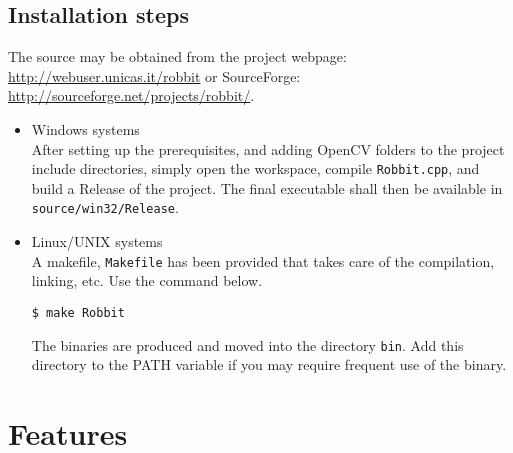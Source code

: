 \documentclass[10pt,a4paper]{article}
\begin{document}
\subsection{Installation steps}
The source may be obtained from the project webpage: \href{http://webuser.unicas.it/robbit}{http://webuser.unicas.it/robbit} or SourceForge: \href{http://sourceforge.net/projects/robbit/}{http://sourceforge.net/projects/robbit/}.

\begin{itemize}
\item Windows systems \\
After setting up the prerequisites, and adding OpenCV folders to the project include directories, simply open the workspace, compile {\tt Robbit.cpp}, and build a Release of the project. The final executable shall then be available in {\tt source/win32/Release}.
\item Linux/UNIX systems \\
A makefile, {\tt Makefile} has been provided that takes care of the compilation, linking, etc. Use the command below.

\begin{verbatim}
$ make Robbit
\end{verbatim}
The binaries are produced and moved into the directory {\tt bin}. Add this directory to the PATH variable if you may require frequent use of the binary.
\end{itemize}

\newpage

\section{Features}
\end{document}
